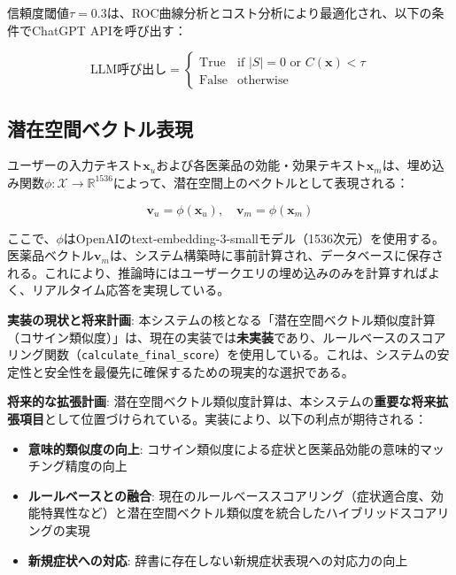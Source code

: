 \documentclass[a4paper,11pt,ja=standard,xelatex]{bxjsarticle}
\theoremstyle{definition}
\begin{document}
信頼度閾値$\tau = 0.3$は、ROC曲線分析とコスト分析により最適化され、以下の条件でChatGPT APIを呼び出す：

\begin{equation}
\text{LLM呼び出し} = \begin{cases}
\text{True} & \text{if } |S| = 0 \text{ or } C(\mathbf{x}) < \tau \\
\text{False} & \text{otherwise}
\end{cases}
\end{equation}

\subsection{潜在空間ベクトル表現}

ユーザーの入力テキスト$\mathbf{x}_u$および各医薬品の効能・効果テキスト$\mathbf{x}_m$は、埋め込み関数$\phi: \mathcal{X} \rightarrow \mathbb{R}^{1536}$によって、潜在空間上のベクトルとして表現される：

\begin{equation}
\mathbf{v}_u = \phi(\mathbf{x}_u), \quad \mathbf{v}_m = \phi(\mathbf{x}_m)
\end{equation}

ここで、$\phi$はOpenAIのtext-embedding-3-smallモデル（1536次元）を使用する。医薬品ベクトル$\mathbf{v}_m$は、システム構築時に事前計算され、データベースに保存される。これにより、推論時にはユーザークエリの埋め込みのみを計算すればよく、リアルタイム応答を実現している。

\textbf{実装の現状と将来計画}: 本システムの核となる「潜在空間ベクトル類似度計算（コサイン類似度）」は、現在の実装では\textbf{未実装}であり、ルールベースのスコアリング関数（\texttt{calculate\_final\_score}）を使用している。これは、システムの安定性と安全性を最優先に確保するための現実的な選択である。

\textbf{将来的な拡張計画}: 潜在空間ベクトル類似度計算は、本システムの\textbf{重要な将来拡張項目}として位置づけられている。実装により、以下の利点が期待される：
\begin{itemize}
\item \textbf{意味的類似度の向上}: コサイン類似度による症状と医薬品効能の意味的マッチング精度の向上
\item \textbf{ルールベースとの融合}: 現在のルールベーススコアリング（症状適合度、効能特異性など）と潜在空間ベクトル類似度を統合したハイブリッドスコアリングの実現
\item \textbf{新規症状への対応}: 辞書に存在しない新規症状表現への対応力の向上
\end{itemize}
\end{document}
